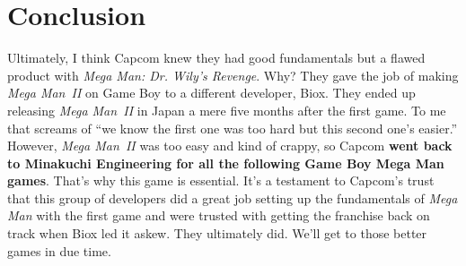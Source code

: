 \documentclass{book}
\begin{document}
\FloatBarrier\section*{Conclusion}
Ultimately, I think Capcom knew they had good fundamentals but a flawed product with \emph{Mega Man: Dr. Wily’s Revenge}. Why? They gave the job of making \emph{Mega Man~II} on Game Boy to a different developer, Biox. They ended up releasing \emph{Mega Man~II} in Japan a mere five months after the first game. To me that screams of “we know the first one was too hard but this second one’s easier.” However, \emph{Mega Man~II} was too easy and kind of crappy, so Capcom \textbf{went back to Minakuchi Engineering for all the following Game Boy Mega Man games}. That’s why this game is essential. It’s a testament to Capcom’s trust that this group of developers did a great job setting up the fundamentals of \emph{Mega Man} with the first game and were trusted with getting the franchise back on track when Biox led it askew. They ultimately did. We’ll get to those better games in due time.\par
\end{document}

